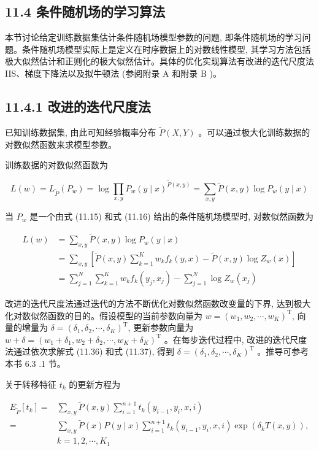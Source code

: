 \documentclass[10pt]{article}
\begin{document}
\begin{CJK*}{UTF8}{bsmi}
\section*{11.4 条件随机场的学习算法}
本节讨论给定训练数据集估计条件随机场模型参数的问题, 即条件随机场的学习问题。条件随机场模型实际上是定义在时序数据上的对数线性模型, 其学习方法包括极大似然估计和正则化的极大似然估计。具体的优化实现算法有改进的迭代尺度法 IIS、梯度下降法以及拟牛顿法 (参阅附录 $\mathrm{A}$ 和附录 $\mathrm{B}$ )。

\subsection*{11.4.1 改进的迭代尺度法}
已知训练数据集, 由此可知经验概率分布 $\tilde{P}(X, Y)$ 。可以通过极大化训练数据的对数似然函数来求模型参数。

训练数据的对数似然函数为

$$
L(w)=L_{\tilde{P}}\left(P_{w}\right)=\log \prod_{x, y} P_{w}(y \mid x)^{\tilde{P}(x, y)}=\sum_{x, y} \tilde{P}(x, y) \log P_{w}(y \mid x)
$$

当 $P_{w}$ 是一个由式 (11.15) 和式 (11.16) 给出的条件随机场模型时, 对数似然函数为

$$
\begin{aligned}
L(w) & =\sum_{x, y} \tilde{P}(x, y) \log P_{w}(y \mid x) \\
& =\sum_{x, y}\left[\tilde{P}(x, y) \sum_{k=1}^{K} w_{k} f_{k}(y, x)-\tilde{P}(x, y) \log Z_{w}(x)\right] \\
& =\sum_{j=1}^{N} \sum_{k=1}^{K} w_{k} f_{k}\left(y_{j}, x_{j}\right)-\sum_{j=1}^{N} \log Z_{w}\left(x_{j}\right)
\end{aligned}
$$

改进的迭代尺度法通过迭代的方法不断优化对数似然函数改变量的下界, 达到极大化对数似然函数的目的。假设模型的当前参数向量为 $w=\left(w_{1}, w_{2}, \cdots, w_{K}\right)^{\mathrm{T}}$, 向量的增量为 $\delta=\left(\delta_{1}, \delta_{2}, \cdots, \delta_{K}\right)^{\mathrm{T}}$, 更新参数向量为 $w+\delta=\left(w_{1}+\delta_{1}, w_{2}+\delta_{2}, \cdots, w_{K}+\delta_{K}\right)^{\mathrm{T}}$ 。在每步迭代过程中, 改进的迭代尺度法通过依次求解式 (11.36) 和式 (11.37), 得到 $\delta=\left(\delta_{1}, \delta_{2}, \cdots, \delta_{K}\right)^{\mathrm{T}}$ 。推导可参考本书 6.3 .1 节。

关于转移特征 $t_{k}$ 的更新方程为


\begin{align*}
E_{\tilde{P}}\left[t_{k}\right]= & \sum_{x, y} \tilde{P}(x, y) \sum_{i=1}^{n+1} t_{k}\left(y_{i-1}, y_{i}, x, i\right) \\
= & \sum_{x, y} \tilde{P}(x) P(y \mid x) \sum_{i=1}^{n+1} t_{k}\left(y_{i-1}, y_{i}, x, i\right) \exp \left(\delta_{k} T(x, y)\right), \\
& k=1,2, \cdots, K_{1} \tag{11.36}
\end{align*}



\end{CJK*}
\end{document}
